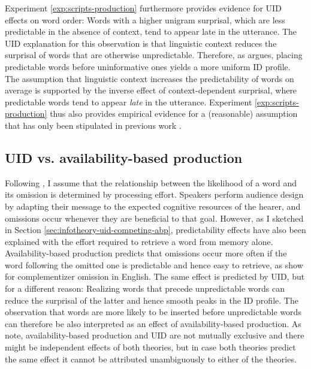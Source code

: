 Experiment \ref{exp:scripts-production} furthermore provides evidence for UID effects on word order: Words with a higher unigram surprisal, which are less predictable in the absence of context, tend to appear late in the utterance. The UID explanation for this observation is that linguistic context reduces the surprisal of words that are otherwise unpredictable. Therefore, as \citet{fenk-oczlon1983} argues, placing predictable words before uninformative ones yields a more uniform ID profile. The assumption that linguistic context increases the predictability of words on average is supported by the inverse effect of context-depen\-dent surprisal, where predictable words tend to appear \textit{late} in the utterance. Experiment \ref{exp:scripts-production} thus also provides empirical evidence for a (reasonable) assumption that has only been stipulated in previous work \citep{fenk-oczlon1983, fenk-oczlon1989, genzel.charniak2002}.

\subsection{UID vs. availability-based production}

Following \citet{hale2001}, I assume that the relationship between the likelihood of a word and its omission is determined by processing effort. Speakers perform audience design by adapting their message to  the expected cognitive resources of the hearer, and omissions occur whenever they are beneficial to that goal. However, as I sketched in Section \ref{sec:infotheory-uid-competing-abp}, predictability effects have also been explained with the effort required to retrieve a word from memory alone. Availability-based production predicts that omissions occur more often if the word following the omitted one is predictable and hence easy to retrieve, as \citet{ferreira.dell2000} show for complementizer omission in English. The same effect is predicted by UID, but for a different reason: Realizing words that precede unpredictable words can reduce the surprisal of the latter and hence smooth peaks in the ID profile. The observation that words are more likely to be inserted before unpredictable words can therefore be also interpreted as an effect of availability-based production. As \citet{jaeger.buz2017} note, availability-based production and UID are not mutually exclusive and there might be independent effects of both theories, but in case both theories predict the same effect it cannot be attributed unambiguously to either of the theories.

